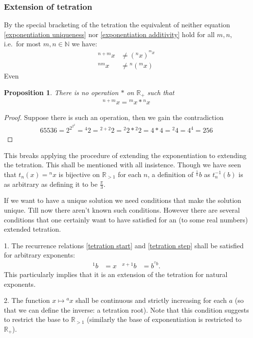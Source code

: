 \documentclass[12pt]{article}
\newtheorem{proposition}{Proposition}
\theoremstyle{definition}
\newcommand{\N}{\mathbb{N}}
\newcommand{\R}{\mathbb{R}}
\newcommand{\RP}{\mathbb{R}_+}
\newcommand{\RI}{\R_{>1}}
\newcommand{\tet}[2]{{{}^{#2}{#1}}}
\begin{document}
\subsubsection{Extension of tetration}

By the special bracketing of the tetration the equivalent of neither 
equation \eqref{exponentiation uniqueness} nor \eqref{exponentiation
  additivity} hold for all $m,n$, i.e.\ for most $m,n\in\N$ we have: 
\begin{align}
  \tet{x}{n+m} &\neq \left({}^nx\right)^{{}^m x}\\
  {}^{nm}x &\neq {}^n({}^m x)
\end{align}
Even
\begin{proposition}
  There is {\em no} operation $\ast$ on $\RP$ such that
  \begin{align*}
    \tet{x}{n+m}=\tet{x}{m}\ast\tet{x}{n}
  \end{align*}
\end{proposition}
\begin{proof}
  Suppose there is such an operation, then we gain the contradiction
  \begin{align*}
    65536=2^{2^{2^2}}=\tet{2}{4}=\tet{2}{2+2}=\tet{2}{2}\ast
    \tet{2}{2}=4\ast 4=\tet{4}{2}=4^4=256
  \end{align*}
\end{proof}
This breaks applying the procedure of extending the exponentiation to
extending the tetration. This shall be mentioned with all insistence.
Though we have seen that $t_n(x)={}^nx$ is bijective on $\RI$ for
each $n$, a definition of ${}^{\frac{1}{n}}b$ as $t_n^{-1}(b)$ is as
arbitrary as defining it to be $\frac{\pi}{3}$.

If we want to have a unique solution we need conditions that make the
solution unique. Till now there aren't known such conditions. However
there are several conditions that one certainly want to have satisfied
for an (to some real numbers) extended tetration. 

1. The recurrence relations
\eqref{tetration start} and \eqref{tetration step}
shall be satisfied for arbitrary exponents:
\begin{align}
  \tet{b}{1} &= x & \tet{b}{x+1} &= b^{\tet{b}{x}}.\label{tetration
  recurrence}
\end{align}
This particularly implies that it is an extension of the tetration for
natural exponents.

2. The function $x\mapsto \tet{x}{a}$ shall be continuous and
strictly increasing for each $a$ (so that we can define the inverse: a
tetration root). Note that this condition suggests to restrict the
base to $\RI$ (similarly the base of exponentiation is restricted to
$\RP$).
\end{document}
